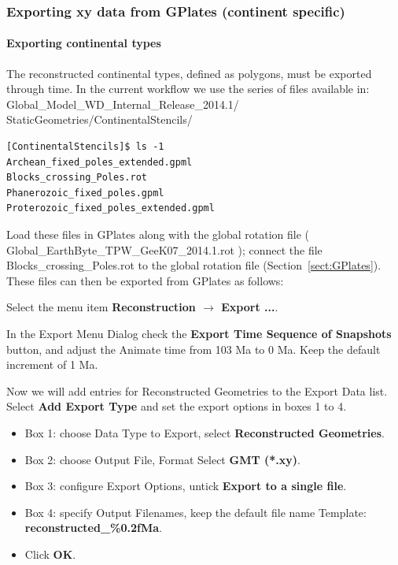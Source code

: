 \documentclass[letterpaper,12pt]{article}
\newcommand{\gp}[1]{\textbf{#1}}
\newcommand{\gplatesmodel}{Global\_Model\_WD\_Internal\_Release\_2014.1/ }
\newcommand{\gplatesmodelrot}{Global\_EarthByte\_TPW\_GeeK07\_2014.1.rot }
\begin{document}
\subsubsection{Exporting xy data from GPlates (continent specific)}
\label{sssect:input_export_cont}

\paragraph{Exporting continental types}

The reconstructed continental types, defined as polygons, must be exported through time.  In the current workflow we use the series of files available in:\\
\gplatesmodel StaticGeometries/ContinentalStencils/

\begin{verbatim}
[ContinentalStencils]$ ls -1
Archean_fixed_poles_extended.gpml
Blocks_crossing_Poles.rot
Phanerozoic_fixed_poles.gpml
Proterozoic_fixed_poles_extended.gpml 
\end{verbatim}

Load these files in GPlates along with the global rotation file ( \gplatesmodelrot ); connect the file Blocks\_crossing\_Poles.rot to the global rotation file (Section~\ref{sect:GPlates}).  These files can then be exported from GPlates as follows:

Select the menu item \gp{Reconstruction $\rightarrow$ Export ...}.

In the Export Menu Dialog check the \gp{Export Time Sequence of Snapshots} button, 
and adjust the Animate time from 103 Ma to 0 Ma.  Keep the default increment of 1 Ma.

Now we will add entries for Reconstructed Geometries to the Export Data list.
Select \gp{Add Export Type} and set the export options in boxes 1 to 4.

\begin{itemize}
\item Box 1: choose Data Type to Export, select \gp{Reconstructed Geometries}.
\item Box 2: choose Output File, Format Select \gp{GMT (*.xy)}.
\item Box 3: configure Export Options, untick \gp{Export to a single file}.
\item Box 4: specify Output Filenames, keep the default file name Template: \gp{reconstructed\_\%0.2fMa}.
\item Click \gp{OK}.
\end{itemize}
\end{document}
